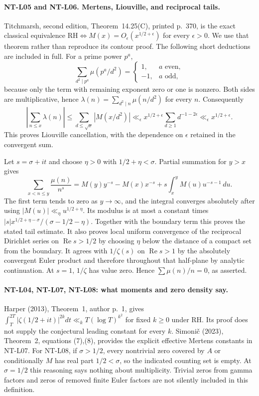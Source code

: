 \documentclass[11pt,a4paper]{article}
\begin{document}
\paragraph{NT-L05 and NT-L06. Mertens, Liouville, and reciprocal tails.}
Titchmarsh, second edition, Theorem~14.25(C), printed p.~370, is the exact
classical equivalence
$\mathrm{RH}\Longleftrightarrow M(x)=O_\epsilon(x^{1/2+\epsilon})$
for every $\epsilon>0$.  We use that theorem rather than reproduce its
contour proof.  The following short deductions are included in full.
For a prime power $p^a$,
\[
 \sum_{d^2\mid p^a}\mu(p^a/d^2)=
 \begin{cases}1,&a\text{ even},\\-1,&a\text{ odd},\end{cases}
\]
because only the term with remaining exponent zero or one is nonzero.
Both sides are multiplicative, hence
$\lambda(n)=\sum_{d^2\mid n}\mu(n/d^2)$ for every $n$.
Consequently
\[
 \left|\sum_{n\le x}\lambda(n)\right|
 \le\sum_{d\le\sqrt x}|M(x/d^2)|
 \ll_\epsilon x^{1/2+\epsilon}
                \sum_{d\ge1}d^{-1-2\epsilon}
 \ll_\epsilon x^{1/2+\epsilon}.
\]
This proves Liouville cancellation, with the dependence on $\epsilon$
retained in the convergent sum.

Let $s=\sigma+it$ and choose $\eta>0$ with $1/2+\eta<\sigma$.
Partial summation for $y>x$ gives
\[
 \sum_{x<n\le y}\frac{\mu(n)}{n^s}
 =M(y)y^{-s}-M(x)x^{-s}
     +s\int_x^y M(u)u^{-s-1}\,du.
\]
The first term tends to zero as $y\to\infty$, and the integral converges
absolutely after using $|M(u)|\ll_\eta u^{1/2+\eta}$.  Its modulus is at
most a constant times
$|s|x^{1/2+\eta-\sigma}/(\sigma-1/2-\eta)$.
Together with the boundary term this proves the stated tail estimate.
It also proves local uniform convergence of the reciprocal Dirichlet
series on $\operatorname{Re}s>1/2$ by choosing $\eta$ below the distance
of a compact set from the boundary.  It agrees with $1/\zeta(s)$ on
$\operatorname{Re}s>1$ by the absolutely convergent Euler product and
therefore throughout that half-plane by analytic continuation.  At
$s=1$, $1/\zeta$ has value zero.  Hence $\sum\mu(n)/n=0$, as asserted.

\paragraph{NT-L04, NT-L07, NT-L08: what moments and zero density say.}
Harper (2013), Theorem~1, author p.~1, gives
$\int_T^{2T}|\zeta(1/2+it)|^{2k}dt\ll_kT(\log T)^{k^2}$ for fixed
$k\ge0$ under RH.  Its proof does not supply the conjectural leading
constant for every $k$.  Simoni\v c (2023), Theorem~2, equations (7),(8),
provides the explicit effective Mertens constants in NT-L07.
For NT-L08, if $\sigma>1/2$, every nontrivial zero covered by $A$ or
conditionally $M$ has real part $1/2<\sigma$, so the indicated counting
set is empty.  At $\sigma=1/2$ this reasoning says nothing about
multiplicity.  Trivial zeros from gamma factors and zeros of removed
finite Euler factors are not silently included in this definition.
\end{document}
